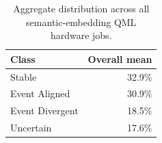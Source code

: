 \begin{table}[!htbp]
\centering
\scriptsize
\begin{tabular}{lr}
\toprule
Class & Overall mean \\
\midrule
Stable & 32.9\% \\
Event Aligned & 30.9\% \\
Event Divergent & 18.5\% \\
Uncertain & 17.6\% \\
\bottomrule
\end{tabular}
\caption{Aggregate distribution across all semantic-embedding QML hardware jobs.}
\label{tab:semantic-overall}
\end{table}
